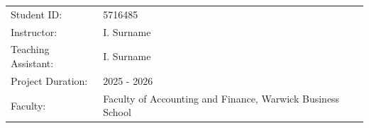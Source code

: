 \begin{titlepage}
\begin{center}
\bigskip
\bigskip

\begin{tabular}{ll}
    Student ID: & 5716485 \\
    Instructor: & I. Surname \\
    Teaching Assistant: & I. Surname \\
    Project Duration: & 2025 - 2026 \\
    Faculty: & Faculty of Accounting and Finance, Warwick Business School
\end{tabular}

\bigskip
\bigskip
\vfill

\end{center}

\begin{figure}[H]
    \centering
\end{figure}

\end{titlepage}

